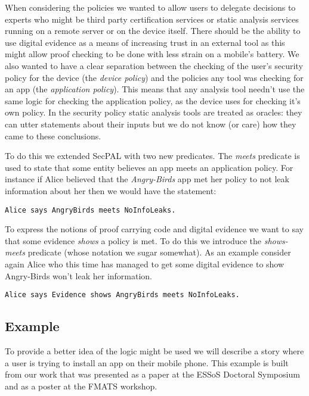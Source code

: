 \documentclass[report.tex]{subfiles}
\begin{document}
When considering the policies we wanted to allow users to delegate decisions to
experts who might be third party certification services or static analysis
services running on a remote server or on the device itself.  There should be
the ability to use digital evidence\cite{Stark:2009uc} as a means of increasing
trust in an external tool as this might allow proof checking to be done with
less strain on a mobile's battery.  We also wanted to have a clear separation
between the checking of the user's security policy for the device (the
\emph{device policy}) and the policies any tool was checking for an app (the
\emph{application policy}).  This means that any analysis tool needn't use the
same logic for checking the application policy, as the device uses for checking
it's own policy.  In the security policy static analysis tools are treated as
oracles: they can utter statements about their inputs but we do not know (or
care) how they came to these conclusions.

To do this we extended SecPAL with two new predicates.  The \emph{meets}
predicate is used to state that some entity believes an app meets an application
policy.  For instance if Alice believed that the \emph{Angry-Birds} app met her
policy to not leak information about her then we would have the statement:

\begin{lstlisting}[language=SecPAL]
Alice says AngryBirds meets NoInfoLeaks.
\end{lstlisting}

To express the notions of proof carrying code\cite{Necula:1996tr} and digital
evidence we want to say that some evidence \emph{shows} a policy is met.  To do
this we introduce the \emph{shows-meets} predicate (whose notation we sugar
somewhat).  As an example consider again Alice who this time has managed to get
some digital evidence to show Angry-Birds won't leak her information.

\begin{lstlisting}[language=SecPAL]
Alice says Evidence shows AngryBirds meets NoInfoLeaks.
\end{lstlisting}

\subsection{Example}

To provide a better idea of the logic might be used we will describe a story
where a user is trying to install an app on their mobile phone.  This example is
built from our work that was presented as a paper at the ESSoS Doctoral
Symposium\cite{Hallett:2014un} and as a poster at the FMATS workshop.
\end{document}
